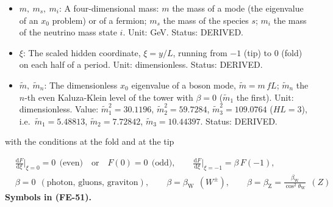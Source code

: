 \documentclass[
  10pt,
]{article}
\begin{document}
\begin{itemize}
  is the profile of the \(n\)-th Kaluza-Klein level of the graviton
  tower (\(F_0 = 1\) the flat zero mode). Unit: dimensionless. Status:
  DERIVED.
\item
  \(m,\ m_s,\ m_i\): A four-dimensional mass: \(m\) the mass of a mode
  (the eigenvalue of an \(x_0\) problem) or of a fermion; \(m_s\) the
  mass of the species \(s\); \(m_i\) the mass of the neutrino mass state
  \(i\). Unit: GeV. Status: DERIVED.
\item
  \(\xi\): The scaled hidden coordinate, \(\xi = y/L\), running from
  \(-1\) (tip) to \(0\) (fold) on each half of a period. Unit:
  dimensionless. Status: DERIVED.
\item
  \(\tilde m,\ \tilde m_n\): The dimensionless \(x_0\) eigenvalue of a
  boson mode, \(\tilde m = m\,fL\); \(\tilde m_n\) the \(n\)-th even
  Kaluza-Klein level of the tower with \(\beta = 0\) (\(\tilde m_1\) the
  first). Unit: dimensionless. Value: \(\tilde m_1^2 = 30.1196\),
  \(\tilde m_2^2 = 59.7284\), \(\tilde m_3^2 = 109.0764\) (\(HL = 3\)),
  i.e.~\(\tilde m_1 = 5.48813\), \(\tilde m_2 = 7.72842\),
  \(\tilde m_3 = 10.44397\). Status: DERIVED.
\end{itemize}

with the conditions at the fold and at the tip

\[
\begin{aligned}
&\frac{\mathrm{d}F}{\mathrm{d}\xi}\Big\vert_{\xi=0} = 0\ \ \text{(even)}\quad\text{or}\quad F(0) =
 0\ \ \text{(odd)},\qquad
 \frac{\mathrm{d}F}{\mathrm{d}\xi}\Big\vert_{\xi=-1} = \beta\,F(-1),\\
&\beta = 0\ \ (\text{photon, gluons, graviton}),\qquad \beta = \beta_{\mathrm{W}}\ \ (W^\pm),\qquad
 \beta = \beta_{\mathrm{Z}} = \frac{\beta_{\mathrm{W}}}{\cos^2\theta_{\mathrm{W}}}\ \ (Z)
\end{aligned} \tag{FE-51}
\] \textbf{Symbols in (FE-51).}
\end{document}
